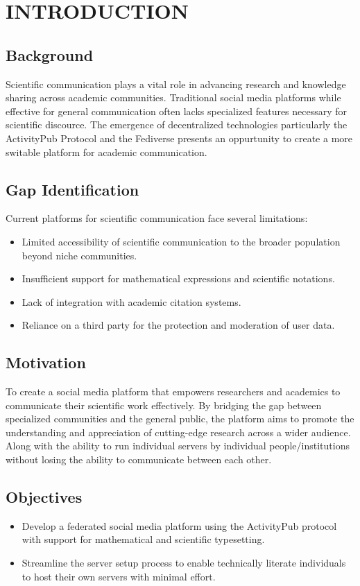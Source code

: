 \chapter{INTRODUCTION}
\section{Background}
Scientific communication plays a vital role in advancing research and knowledge sharing across academic communities. Traditional social media platforms while effective for general communication often lacks specialized features necessary for scientific discource. The emergence of decentralized technologies particularly the ActivityPub \cite{ActivityPub} Protocol and the Fediverse presents an oppurtunity to create a more switable platform for academic communication. 
\section{Gap Identification}
Current platforms for scientific communication face several limitations:

\begin{itemize}
  \item Limited accessibility of scientific communication to the broader population beyond niche communities.
  \item Insufficient support for mathematical expressions and scientific notations.
  \item Lack of integration with academic citation systems.
  \item Reliance on a third party for the protection and moderation of user data.
\end{itemize}

\section{Motivation}
To create a social media platform that empowers researchers and academics to communicate their scientific work effectively. By bridging the gap between specialized communities and the general public, the platform aims to promote the understanding and appreciation of cutting-edge research across a wider audience. Along with the ability to run individual servers by individual people/institutions without losing the ability to communicate between each other.

\section{Objectives}
\begin{itemize}
  \item Develop a federated social media platform using the ActivityPub protocol with support for mathematical and scientific typesetting.
  \item Streamline the server setup process to enable technically literate individuals to host their own servers with minimal effort.
\end{itemize}
